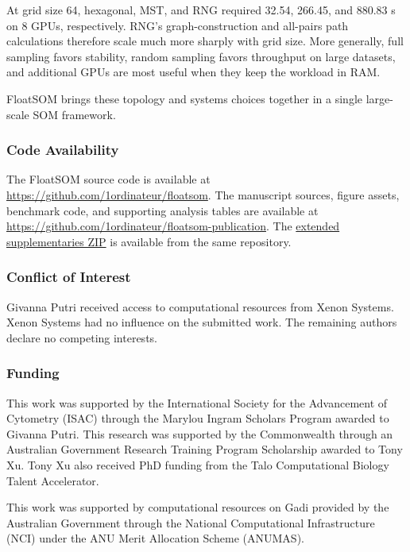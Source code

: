 \documentclass[10pt]{article} %
\begin{document}
At grid size 64, hexagonal, MST, and RNG required 32.54, 266.45, and 880.83 s on 8 GPUs, respectively. RNG's graph-construction and all-pairs path calculations therefore scale much more sharply with grid size. More generally, full sampling favors stability, random sampling favors throughput on large datasets, and additional GPUs are most useful when they keep the workload in RAM.

FloatSOM brings these topology and systems choices together in a single large-scale SOM framework.

\subsubsection*{Code Availability}

The FloatSOM source code is available at \url{https://github.com/1ordinateur/floatsom}. The manuscript sources, figure assets, benchmark code, and supporting analysis tables are available at \url{https://github.com/1ordinateur/floatsom-publication}. The \href{https://github.com/1ordinateur/floatsom-publication/blob/main/extended_supplementaries.zip}{extended supplementaries ZIP} is available from the same repository.

\subsubsection*{Conflict of Interest}

Givanna Putri received access to computational resources from Xenon Systems. Xenon Systems had no influence on the submitted work. The remaining authors declare no competing interests.

\subsubsection*{Funding}

This work was supported by the International Society for the Advancement of Cytometry (ISAC) through the Marylou Ingram Scholars Program awarded to Givanna Putri. This research was supported by the Commonwealth through an Australian Government Research Training Program Scholarship awarded to Tony Xu. Tony Xu also received PhD funding from the Talo Computational Biology Talent Accelerator.

This work was supported by computational resources on Gadi provided by the Australian Government through the National Computational Infrastructure (NCI) under the ANU Merit Allocation Scheme (ANUMAS).
\end{document}
